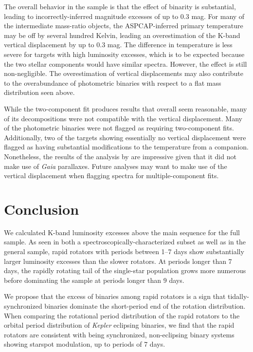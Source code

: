 \documentclass[manuscript]{aastex6}
\newcommand{\Kepler}{\mbox{\textit{Kepler}}}
\newcommand{\Gaia}{\mbox{\textit{Gaia}}}
\begin{document}
The overall behavior in the \citet{ElBadry18b} sample is that the effect of 
binarity is substantial, leading to incorrectly-inferred magnitude excesses of
up to 0.3 mag. For many of the intermediate mass-ratio objects, the 
ASPCAP-inferred primary temperature may be off by several hundred Kelvin, 
leading an overestimation of the K-band vertical displacement by up to 0.3 
mag. The difference in temperature is less severe for targets with high 
luminosity excesses, which is to be expected because the two stellar 
components would have similar spectra. However, the effect is still 
non-negligible. The overestimation of vertical displacements may also contribute 
to the overabundance of photometric binaries with respect to a flat mass 
distribution seen above. 

While the two-component fit produces results that overall seem reasonable, many
of its decompositions were not compatible with the vertical displacement. Many
of the photometric binaries were not flagged as requiring two-component fits.
Additionally, two of the targets showing essentially no vertical displacement
were flagged as having substantial modifications to the temperature from a
companion. Nonetheless, the results of the analysis by \citet{ElBadry18b} are
impressive given that it did not make use of \Gaia{} parallaxes. Future
analyses may want to make use of the vertical displacement when flagging
spectra for multiple-component fits.

\section{Conclusion}
\label{sec:conclusions}

We calculated K-band luminosity excesses above the main sequence for the full
\citet{McQuillan14} sample. As seen in both a spectroscopically-characterized
subset as well as in the general sample, rapid rotators with periods between
1--7 days show substantially larger luminosity excesses than the slower
rotators. At periods longer than 7 days, the rapidly rotating tail of the
single-star population grows more numerous before dominating the sample at
periods longer than 9 days. 

We propose that the excess of binaries among rapid rotators is a sign that
tidally-synchronized binaries dominate the short-period end of the rotation
distribution. When comparing the rotational period distribution of the rapid 
rotators to the orbital period distribution of \Kepler{} eclipsing binaries, we
find that the rapid rotators are consistent with being synchronized, 
non-eclipsing binary systems showing starspot modulation, up to periods of 7
days.
\end{document}
